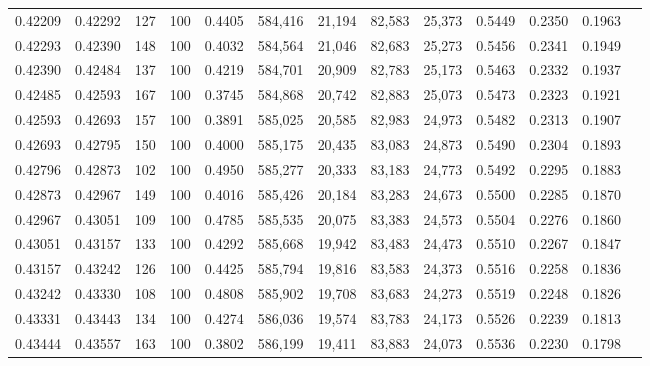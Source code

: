 \begin{tabular}{rrrrrrrrrrrrr}
0.42209 & 0.42292 &   127 & 100 &                                     0.4405 & 584,416 &  21,194 &  82,583 &  25,373 & 0.5449 & 0.2350 & 0.1963 \\
0.42293 & 0.42390 &   148 & 100 &                                     0.4032 & 584,564 &  21,046 &  82,683 &  25,273 & 0.5456 & 0.2341 & 0.1949 \\
0.42390 & 0.42484 &   137 & 100 &                                     0.4219 & 584,701 &  20,909 &  82,783 &  25,173 & 0.5463 & 0.2332 & 0.1937 \\
0.42485 & 0.42593 &   167 & 100 &                                     0.3745 & 584,868 &  20,742 &  82,883 &  25,073 & 0.5473 & 0.2323 & 0.1921 \\
0.42593 & 0.42693 &   157 & 100 &                                     0.3891 & 585,025 &  20,585 &  82,983 &  24,973 & 0.5482 & 0.2313 & 0.1907 \\
0.42693 & 0.42795 &   150 & 100 &                                     0.4000 & 585,175 &  20,435 &  83,083 &  24,873 & 0.5490 & 0.2304 & 0.1893 \\
0.42796 & 0.42873 &   102 & 100 &                                     0.4950 & 585,277 &  20,333 &  83,183 &  24,773 & 0.5492 & 0.2295 & 0.1883 \\
0.42873 & 0.42967 &   149 & 100 &                                     0.4016 & 585,426 &  20,184 &  83,283 &  24,673 & 0.5500 & 0.2285 & 0.1870 \\
0.42967 & 0.43051 &   109 & 100 &                                     0.4785 & 585,535 &  20,075 &  83,383 &  24,573 & 0.5504 & 0.2276 & 0.1860 \\
0.43051 & 0.43157 &   133 & 100 &                                     0.4292 & 585,668 &  19,942 &  83,483 &  24,473 & 0.5510 & 0.2267 & 0.1847 \\
0.43157 & 0.43242 &   126 & 100 &                                     0.4425 & 585,794 &  19,816 &  83,583 &  24,373 & 0.5516 & 0.2258 & 0.1836 \\
0.43242 & 0.43330 &   108 & 100 &                                     0.4808 & 585,902 &  19,708 &  83,683 &  24,273 & 0.5519 & 0.2248 & 0.1826 \\
0.43331 & 0.43443 &   134 & 100 &                                     0.4274 & 586,036 &  19,574 &  83,783 &  24,173 & 0.5526 & 0.2239 & 0.1813 \\
0.43444 & 0.43557 &   163 & 100 &                                     0.3802 & 586,199 &  19,411 &  83,883 &  24,073 & 0.5536 & 0.2230 & 0.1798 \\

\end{tabular}
